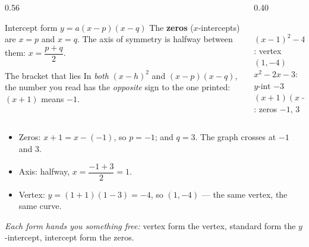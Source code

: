 \documentclass[aspectratio=169, 11pt]{beamer}
\newcommand{\qgrid}[4]{%
  \draw[step=1, linegray!45, very thin] (#1,#3) grid (#2,#4);
  \draw[->, thick, charcoal] (#1,0)--(#2,0) node[below right, font=\tiny]{$x$};
  \draw[->, thick, charcoal] (0,#3)--(0,#4) node[left, font=\tiny]{$y$};}
\newcommand{\fdot}[3]{\fill[#1] (#2,#3) circle (5.5pt);}
\begin{document}
\begin{frame}[t, plain]
  \begin{columns}[T]
    \begin{column}{0.56\textwidth}
      \begin{block}{Intercept form $y=a(x-p)(x-q)$}
        The \textbf{zeros} ($x$-intercepts) are $x=p$ and $x=q$. The axis of symmetry is
        halfway between them: $x=\dfrac{p+q}{2}$.
      \end{block}
      \vspace{2pt}
      \begin{block}{The bracket that lies}
        In \emph{both} $(x-h)^2$ and $(x-p)(x-q)$, the number you read has the
        \emph{opposite} sign to the one printed: $(x+1)$ means $-1$.
      \end{block}
    \end{column}
    \begin{column}{0.40\textwidth}
      \centering
      \\[-2pt]
      {\scriptsize $(x-1)^2-4$: {\color{navy}vertex $(1,-4)$} \\ $x^2-2x-3$:
      {\color{goldacc}$y$-int $-3$} \\ $(x+1)(x-3)$: {\color{redacc}zeros $-1$, $3$}}
    \end{column}
  \end{columns}
\end{frame}

\begin{frame}[t, plain]
  \begin{itemize}\setlength{\itemsep}{6pt}
    \item Zeros: $x+1=x-(-1)$, so $p=-1$; and $q=3$. \pause \; The graph crosses at $-1$ and
          $3$.
    \pause
    \item Axis: halfway, $x=\dfrac{-1+3}{2}=1$.
    \pause
    \item Vertex: $y=(1+1)(1-3)=-4$, so $(1,-4)$ --- the same vertex, the same curve.
  \end{itemize}
  \pause
  \vspace{4pt}
  \emph{Each form hands you something free:} vertex form the vertex, standard form the
  $y$-intercept, intercept form the zeros.
\end{frame}
\end{document}
